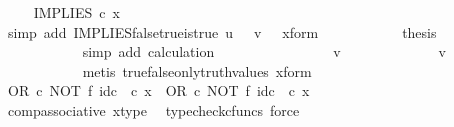\begin{isabellebody}
\ \isamarkupfalse%
\ {\isachardoublequoteopen}{\isachardot}{\kern0pt}{\isachardot}{\kern0pt}{\isachardot}{\kern0pt}\ {\isacharequal}{\kern0pt}\ IMPLIES\ {\isasymcirc}\isactrlsub c\ x{\isachardoublequoteclose}\isanewline
\ \ \ \ \ \ \ \ \ \ \isamarkupfalse%
\ {\isacharparenleft}{\kern0pt}simp\ add{\isacharcolon}{\kern0pt}\ IMPLIES{\isacharunderscore}{\kern0pt}false{\isacharunderscore}{\kern0pt}true{\isacharunderscore}{\kern0pt}is{\isacharunderscore}{\kern0pt}true\ {\isacartoucheopen}u\ {\isacharequal}{\kern0pt}\ {\isasymf}{\isacartoucheclose}\ {\isacartoucheopen}v\ {\isacharequal}{\kern0pt}\ {\isasymt}{\isacartoucheclose}\ x{\isacharunderscore}{\kern0pt}form{\isacharparenright}{\kern0pt}\isanewline
\ \ \ \ \ \ \ \ \isamarkupfalse%
\ \isamarkupfalse%
\ {\isacharquery}{\kern0pt}thesis\isanewline
\ \ \ \ \ \ \ \ \ \ \isamarkupfalse%
\ {\isacharparenleft}{\kern0pt}simp\ add{\isacharcolon}{\kern0pt}\ calculation{\isacharparenright}{\kern0pt}\isanewline
\ \ \ \ \ \ \isamarkupfalse%
\isanewline
\ \ \ \ \ \ \ \ \isamarkupfalse%
\ {\isachardoublequoteopen}v\ {\isasymnoteq}\ {\isasymt}{\isachardoublequoteclose}\isanewline
\ \ \ \ \ \ \ \ \isamarkupfalse%
\ \isamarkupfalse%
\ {\isachardoublequoteopen}v\ {\isacharequal}{\kern0pt}\ {\isasymf}{\isachardoublequoteclose}\isanewline
\ \ \ \ \ \ \ \ \ \ \isamarkupfalse%
\ {\isacharparenleft}{\kern0pt}metis\ true{\isacharunderscore}{\kern0pt}false{\isacharunderscore}{\kern0pt}only{\isacharunderscore}{\kern0pt}truth{\isacharunderscore}{\kern0pt}values\ x{\isacharunderscore}{\kern0pt}form{\isacharparenright}{\kern0pt}\isanewline
\ \ \ \ \ \ \ \ \isamarkupfalse%
\ {\isachardoublequoteopen}{\isacharparenleft}{\kern0pt}OR\ {\isasymcirc}\isactrlsub c\ NOT\ {\isasymtimes}\isactrlsub f\ id\isactrlsub c\ {\isasymOmega}{\isacharparenright}{\kern0pt}\ {\isasymcirc}\isactrlsub c\ x\ {\isacharequal}{\kern0pt}\ OR\ {\isasymcirc}\isactrlsub c\ {\isacharparenleft}{\kern0pt}NOT\ {\isasymtimes}\isactrlsub f\ id\isactrlsub c\ {\isasymOmega}{\isacharparenright}{\kern0pt}\ {\isasymcirc}\isactrlsub c\ x{\isachardoublequoteclose}\isanewline
\ \ \ \ \ \ \ \ \ \ \isamarkupfalse%
\ comp{\isacharunderscore}{\kern0pt}associative{}\ x{\isacharunderscore}{\kern0pt}type\ \isamarkupfalse%
\ {\isacharparenleft}{\kern0pt}typecheck{\isacharunderscore}{\kern0pt}cfuncs{\isacharcomma}{\kern0pt}\ force{\isacharparenright}{\kern0pt}\isanewline

\end{isabellebody}
